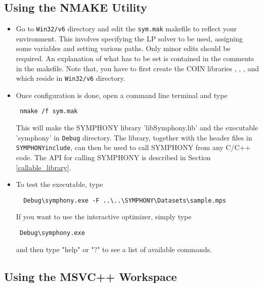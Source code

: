 \subsection{Using the NMAKE Utility}
\label{using_nmake}
\begin{itemize}
\item Go to \texttt{Win32/v6} directory and edit the \texttt{sym.mak} 
makefile to reflect 
your environment. This involves specifying the LP solver to be used, 
assigning some variables and  setting various paths. Only minor edits 
should be required. An explanation of what has to be set is contained in the 
comments in the makefile.  Note that, you have to first create the COIN 
libraries , , ,  and  
which reside in \texttt{Win32/v6} directory.

\item Once configuration is done, open a command line terminal and type 
{\color{Brown}
\begin{verbatim}
 nmake /f sym.mak
\end{verbatim}
}
This will make the SYMPHONY library 'libSymphony.lib' and the executable 
'symphony' in \texttt{Debug} directory. The library, together with the 
header files in \texttt{SYMPHONY\bs include\bs}, can then be used to call 
SYMPHONY from any C/C++ code. The API for calling SYMPHONY is described in 
Section \ref{callable_library}.

\item To test the executable, type 
{\color{Brown}
\begin{verbatim}
  Debug\symphony.exe -F ..\..\SYMPHONY\Datasets\sample.mps
\end{verbatim}
}

If you want to use the interactive optimizer, simply type  
{\color{Brown}
\begin{verbatim}
 Debug\symphony.exe 
\end{verbatim}
}
and then type "help" or "?" to see a list of available commands.
\end{itemize}

\subsection{Using the MSVC++ Workspace}

